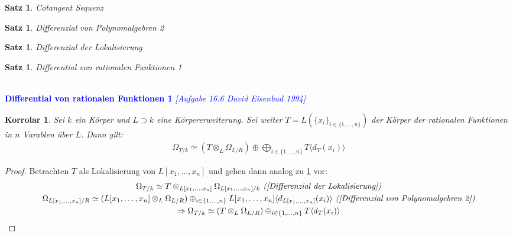 \documentclass[10pt,a4paper]{report}
\newcommand{\ModulsOfDifferenzials}{David Eisenbud 1994}
\newcounter{Aussage}[chapter]
\newtheorem{satz}[Aussage]{Satz}
\newtheorem{korrolar}[Aussage]{Korrolar}
\newcommand{\divR}[2]{\Omega_{#1/#2}}
\newcommand{\divf}[1]{d_{#1}}
\newcommand{\Tensor}[3]{#1 \otimes_{#2} #3}
\newcommand{\Verz}[1]{\langle #1 \rangle}
\begin{document}
\begin{satz}\label{Cotangent Sequenz}
Cotangent Sequenz
\end{satz}

\begin{satz}\label{Differenzial von Polynomalgebren 2}
Differenzial von Polynomalgebren 2
\end{satz}

\begin{satz}\label{Differenzial der Lokalisierung}
Differenzial der Lokalisierung
\end{satz}

\begin{satz}\label{Differential von rationalen Funktionen 1}
Differential von rationalen Funktionen 1
\end{satz}


\ \\
\textcolor{blue}{\textbf{Differential von rationalen Funktionen 1} \textit{[Aufgabe 16.6 \ModulsOfDifferenzials]}}
\begin{korrolar}\label{Differential von rationalen Funktionen 2}
Sei $k$ ein Körper und $L \supset k$ eine Körpererweiterung. Sei weiter $T = L(\lbrace x_i \rbrace_{i \in \lbrace 1,\dots,n \rbrace})$ der Körper der rationalen Funktionen in $n$ Varablen über $L$. Dann gilt:
\begin{gather*}
\divR{T}{k} \simeq (\Tensor{T}{L}{\divR{L}{R}}) \oplus \bigoplus_{i \in \lbrace 1,\dots,n \rbrace} T \Verz{\divf{T}(x_i)}
\end{gather*}
\end{korrolar}
\begin{proof}
Betrachten $T$ als Lokalisierung von $L[x_1,\dots,x_n]$ und gehen dann analog zu \cref{Differential von rationalen Funktionen 1} vor:
\begin{gather*}
\divR{T}{k} \simeq \Tensor{T}{L[x_1,\dots,x_n]}{\divR{L[x_1,\dots,x_n]}{k}} \textit{ (\cref{Differenzial der Lokalisierung})} \\
\divR{L[x_1,\dots,x_n]}{R} \simeq (\Tensor{L[x_1,\dots,x_n]}{L}{\divR{L}{R}}) \oplus_{i \in \lbrace 1,...,n \rbrace} L[x_1,\dots,x_n] \Verz{\divf{L[x_1,\dots,x_n]}(x_i)} \textit{ (\cref{Differenzial von Polynomalgebren 2})} \\
\Rightarrow \divR{T}{k} \simeq (\Tensor{T}{L}{\divR{L}{R}}) \oplus_{i \in \lbrace 1,\dots,n \rbrace} T \Verz{\divf{T}(x_i)}
\end{gather*}
\end{proof}
\end{document}
